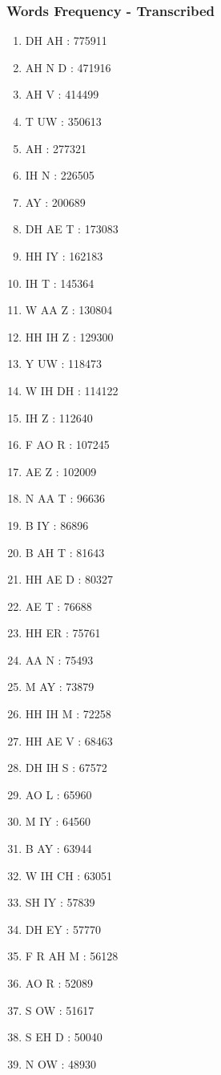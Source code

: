 \documentclass[notes]{beamer}
\begin{document}
\frame
{
  \frametitle{Words Frequency - Transcribed}
\begin{tiny}
\begin{multicols}{4}
\begin{enumerate}
    \item DH AH : 775911
	\item AH N D : 471916
	\item AH V : 414499
	\item T UW : 350613
	\item AH : 277321
	\item IH N : 226505
	\item AY : 200689
	\item DH AE T : 173083
	\item HH IY : 162183
	\item IH T : 145364
	\item W AA Z : 130804
	\item HH IH Z : 129300
	\item Y UW : 118473
	\item W IH DH : 114122
	\item IH Z : 112640
	\item F AO R : 107245
	\item AE Z : 102009
	\item N AA T : 96636
	\item B IY : 86896
	\item B AH T : 81643
	\item HH AE D : 80327
	\item AE T : 76688
	\item HH ER : 75761
	\item AA N : 75493
	\item M AY : 73879
	\item HH IH M : 72258
	\item HH AE V : 68463
	\item DH IH S : 67572
	\item AO L : 65960
	\item M IY : 64560
	\item B AY : 63944
	\item W IH CH : 63051
	\item SH IY : 57839
	\item DH EY : 57770
	\item F R AH M : 56128
	\item AO R : 52089
	\item S OW : 51617
	\item S EH D : 50040
	\item N OW : 48930

\end{enumerate}
\end{multicols}
\end{tiny}}
\end{document}
